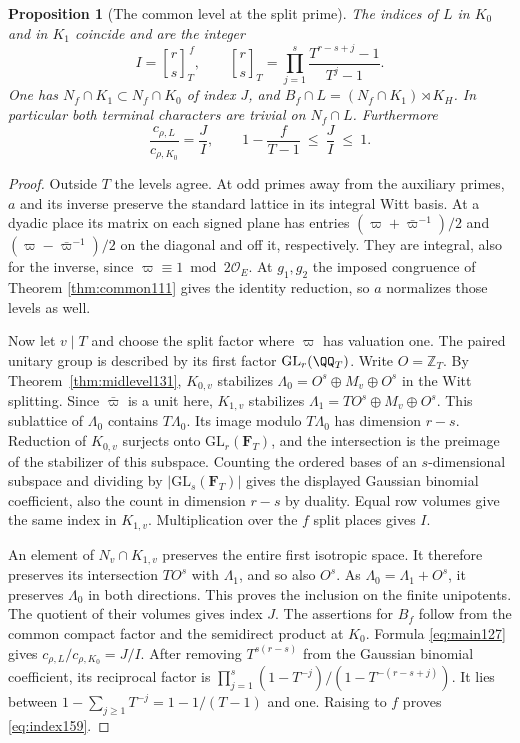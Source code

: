 \documentclass[a4paper,11pt]{article}
\newtheorem{proposition}{Proposition}[section]
\theoremstyle{definition}
\theoremstyle{remark}
\newcommand{\ZZ}{\mathbb Z}\newcommand{\ord}{\operatorname{ord}}
\numberwithin{equation}{section}
\begin{document}
\begin{proposition}[The common level at the split prime]
\label{prop:index159}
The indices of \(L\) in \(K_0\) and in \(K_1\) coincide and
are the integer
\[
             I={r\brack s}_T^{\,f},\qquad
       {r\brack s}_T=\prod_{j=1}^{s}
                         \frac{T^{r-s+j}-1}{T^j-1}.
\]
One has \(N_f\cap K_1\subset N_f\cap K_0\) of index \(J\),
and \(B_f\cap L=(N_f\cap K_1)\rtimes K_H\). In particular
both terminal characters are trivial on \(N_f\cap L\).
Furthermore
\begin{equation}
        \frac{c_{\rho,L}}{c_{\rho,K_0}}=\frac{J}{I},
          \qquad 1-\frac f{T-1}\ \le\ \frac{J}{I}\ \le\ 1 .
        \label{eq:index159}
\end{equation}
\end{proposition}
\begin{proof}
Outside \(T\) the levels agree. At odd primes away from the
auxiliary primes, \(a\) and its inverse preserve the standard
lattice in its integral Witt basis. At a dyadic place its
matrix on each signed plane has entries
\((\varpi+\bar\varpi^{-1})/2\) and
\((\varpi-\bar\varpi^{-1})/2\) on the diagonal and off it,
respectively. They are integral, also for the inverse, since
\(\varpi\equiv1\bmod 2\mathcal O_E\). At \(g_1,g_2\) the
imposed congruence of Theorem \ref{thm:common111} gives the
identity reduction, so \(a\) normalizes those levels as
well.

Now let \(v\mid T\) and choose the split factor where
\(\varpi\) has valuation one. The paired unitary group is
described by its first factor \(\mathrm{GL}_r(\QQ_T)\).
Write \(O=\ZZ_T\). By Theorem~\ref{thm:midlevel131},
\(K_{0,v}\) stabilizes
\(\Lambda_0=O^s\oplus M_v\oplus O^s\) in the Witt splitting.
Since \(\bar\varpi\) is a unit here, \(K_{1,v}\) stabilizes
\(\Lambda_1=TO^s\oplus M_v\oplus O^s\).
This sublattice of \(\Lambda_0\) contains \(T\Lambda_0\).
Its image modulo \(T\Lambda_0\) has dimension \(r-s\).
Reduction of \(K_{0,v}\) surjects onto
\(\mathrm{GL}_r(\mathbf F_T)\), and the intersection is the
preimage of the stabilizer of this subspace. Counting the
ordered bases of an \(s\)-dimensional subspace and dividing
by \(|\mathrm{GL}_s(\mathbf F_T)|\) gives the displayed
Gaussian binomial coefficient, also the count in dimension
\(r-s\) by duality. Equal row volumes give the same index
in \(K_{1,v}\). Multiplication over the \(f\) split places
gives \(I\).

An element of \(N_v\cap K_{1,v}\) preserves the entire first
isotropic space. It therefore preserves its intersection
\(TO^s\) with \(\Lambda_1\), and so also \(O^s\). As
\(\Lambda_0=\Lambda_1+O^s\), it preserves \(\Lambda_0\) in
both directions. This proves the inclusion on the finite
unipotents. The quotient of their volumes gives index \(J\).
The assertions for \(B_f\) follow from the common compact
factor and the semidirect product at \(K_0\). Formula
\eqref{eq:main127} gives \(c_{\rho,L}/c_{\rho,K_0}=J/I\).
After removing \(T^{s(r-s)}\) from the Gaussian binomial
coefficient, its reciprocal factor is
\(\prod_{j=1}^{s}(1-T^{-j})/(1-T^{-(r-s+j)})\). It lies
between \(1-\sum_{j\ge1}T^{-j}=1-1/(T-1)\) and one.
Raising to \(f\) proves \eqref{eq:index159}.
\end{proof}
\end{document}
